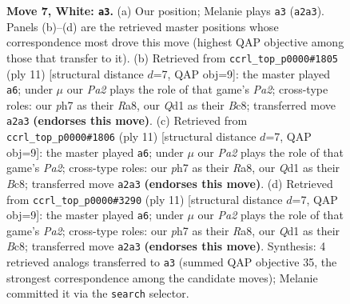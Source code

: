 \documentclass[11pt]{article}
\begin{document}
\begin{figure}[p]
\caption{\textbf{Move 7, White: \texttt{a3}.} (a) Our position; Melanie plays \texttt{a3} (\texttt{a2a3}). Panels (b)--(d) are the retrieved master positions whose correspondence most drove this move (highest QAP objective among those that transfer to it). (b) Retrieved from \texttt{ccrl\_top\_p0000\#1805} (ply 11) [structural distance $d$=7, QAP obj=9]: the master played \texttt{a6}; under $\mu$ our \emph{Pa2} plays the role of that game's \emph{Pa2}; cross-type roles: our \emph{p}h7 as their \emph{R}a8, our \emph{Q}d1 as their \emph{B}c8; transferred move \texttt{a2a3} \textbf{(endorses this move)}. (c) Retrieved from \texttt{ccrl\_top\_p0000\#1806} (ply 11) [structural distance $d$=7, QAP obj=9]: the master played \texttt{a6}; under $\mu$ our \emph{Pa2} plays the role of that game's \emph{Pa2}; cross-type roles: our \emph{p}h7 as their \emph{R}a8, our \emph{Q}d1 as their \emph{B}c8; transferred move \texttt{a2a3} \textbf{(endorses this move)}. (d) Retrieved from \texttt{ccrl\_top\_p0000\#3290} (ply 11) [structural distance $d$=7, QAP obj=9]: the master played \texttt{a6}; under $\mu$ our \emph{Pa2} plays the role of that game's \emph{Pa2}; cross-type roles: our \emph{p}h7 as their \emph{R}a8, our \emph{Q}d1 as their \emph{B}c8; transferred move \texttt{a2a3} \textbf{(endorses this move)}. Synthesis: 4 retrieved analogs transferred to \texttt{a3} (summed QAP objective 35, the strongest correspondence among the candidate moves); Melanie committed it via the \texttt{search} selector.}
\label{fig:thought-m12}
\end{figure}

\clearpage
\end{document}
